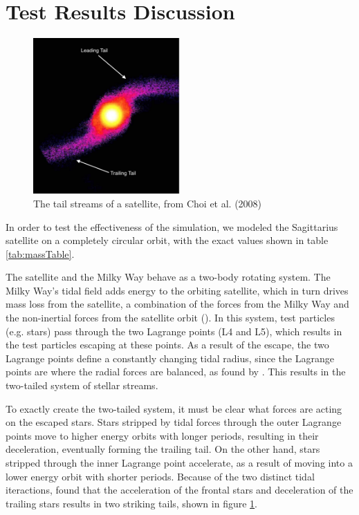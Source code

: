 \documentclass[twocolumn]{article}
\begin{document}
\section{Test Results Discussion}

\begin{figure}
	\centering
	\includegraphics[width=0.5\textwidth]{tailStreams}	
	\caption{The tail streams of a satellite, from Choi et al. (2008)}
	\label{fig:tailstreams}
\end{figure}

In order to test the effectiveness of the simulation, we modeled the Sagittarius satellite on a completely circular orbit, with the exact values shown in table \ref{tab:massTable}.

The satellite and the Milky Way behave as a two-body rotating system. The Milky Way's tidal field adds energy to the orbiting satellite, which in turn drives mass loss from the satellite, a combination of the forces from the Milky Way and the non-inertial forces from the satellite orbit (\cite{structureofDarkMatterHalos}). In this system, test particles (e.g. stars) pass through the two Lagrange points (L4 and L5), which results in the test particles escaping at these points. As a result of the escape, the two Lagrange points define a constantly changing tidal radius, since the Lagrange points are where the radial forces are balanced, as found by \cite{dynamicsOfTidalTails}. This results in the two-tailed system of stellar streams.

To exactly create the two-tailed system, it must be clear what forces are acting on the escaped stars. Stars stripped by tidal forces through the outer Lagrange points move to higher energy orbits with longer periods, resulting in their deceleration, eventually forming the trailing tail. On the other hand, stars stripped through the inner Lagrange point accelerate, as a result of moving into a lower energy orbit with shorter periods. Because of the two distinct tidal iteractions, \cite{ibataLewis} found that the acceleration of the frontal stars and deceleration of the trailing stars results in two striking tails, shown in figure \ref{fig:tailstreams}.
\end{document}
